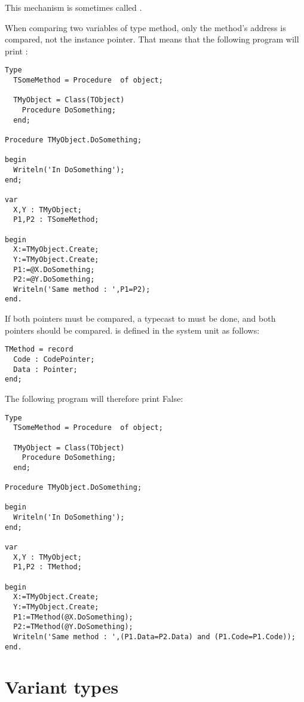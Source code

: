 This mechanism is sometimes called .

\begin{remark}
When comparing two variables of type method, only the method's address is compared,
not the instance pointer. That means that the following program will print :
\begin{verbatim}
Type
  TSomeMethod = Procedure  of object;

  TMyObject = Class(TObject)
    Procedure DoSomething;
  end;

Procedure TMyObject.DoSomething;

begin
  Writeln('In DoSomething');
end;

var
  X,Y : TMyObject;
  P1,P2 : TSomeMethod;

begin
  X:=TMyObject.Create;
  Y:=TMyObject.Create;
  P1:=@X.DoSomething;
  P2:=@Y.DoSomething;
  Writeln('Same method : ',P1=P2);
end.
\end{verbatim}
If both pointers must be compared, a typecast to  must be done, and
both pointers should be compared.  is defined in the system
unit as follows:
\begin{verbatim}
TMethod = record
  Code : CodePointer;
  Data : Pointer;
end;
\end{verbatim}
The following program will therefore print False:
\begin{verbatim}
Type
  TSomeMethod = Procedure  of object;

  TMyObject = Class(TObject)
    Procedure DoSomething;
  end;

Procedure TMyObject.DoSomething;

begin
  Writeln('In DoSomething');
end;

var
  X,Y : TMyObject;
  P1,P2 : TMethod;

begin
  X:=TMyObject.Create;
  Y:=TMyObject.Create;
  P1:=TMethod(@X.DoSomething);
  P2:=TMethod(@Y.DoSomething);
  Writeln('Same method : ',(P1.Data=P2.Data) and (P1.Code=P1.Code));
end.
\end{verbatim}
\end{remark}

\section{Variant types}
 
